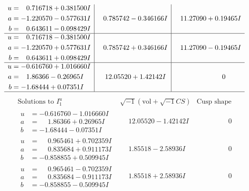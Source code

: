 \documentclass[1p]{elsarticle_modified}
\theoremstyle{definition}
\newcommand{\I}{\sqrt{-1}}
\begin{document}
$$\begin{array}{c|c|c}
\begin{aligned}
u &= \phantom{-}0.716718 + 0.381500 I \\
a &= -1.220570 - 0.577631 I \\
b &= \phantom{-}0.643611 - 0.098429 I\end{aligned}
 & \phantom{-}0.785742 - 0.346166 I & \phantom{-}11.27090 + 0.19465 I \\ \hline\begin{aligned}
u &= \phantom{-}0.716718 - 0.381500 I \\
a &= -1.220570 + 0.577631 I \\
b &= \phantom{-}0.643611 + 0.098429 I\end{aligned}
 & \phantom{-}0.785742 + 0.346166 I & \phantom{-}11.27090 - 0.19465 I \\ \hline\begin{aligned}
u &= -0.616760 + 1.016660 I \\
a &= \phantom{-}1.86366 - 0.26965 I \\
b &= -1.68444 + 0.07351 I\end{aligned}
 & \phantom{-}12.05520 + 1.42142 I & \phantom{-0.000000 } 0\\
 \hline 
 \end{array}$$\newpage$$\begin{array}{c|c|c}  
\text{Solutions to }I^u_{1}& \I (\text{vol} + \sqrt{-1}CS) & \text{Cusp shape}\\
 \hline 
\begin{aligned}
u &= -0.616760 - 1.016660 I \\
a &= \phantom{-}1.86366 + 0.26965 I \\
b &= -1.68444 - 0.07351 I\end{aligned}
 & \phantom{-}12.05520 - 1.42142 I & \phantom{-0.000000 } 0 \\ \hline\begin{aligned}
u &= \phantom{-}0.965461 + 0.702359 I \\
a &= \phantom{-}0.835684 + 0.911173 I \\
b &= -0.858855 + 0.509945 I\end{aligned}
 & \phantom{-}1.85518 - 2.58936 I & \phantom{-0.000000 } 0 \\ \hline\begin{aligned}
u &= \phantom{-}0.965461 - 0.702359 I \\
a &= \phantom{-}0.835684 - 0.911173 I \\
b &= -0.858855 - 0.509945 I\end{aligned}
 & \phantom{-}1.85518 + 2.58936 I & \phantom{-0.000000 } 0 \\ \hline\begin{aligned}

\end{aligned}
\end{array}$$
\end{document}
